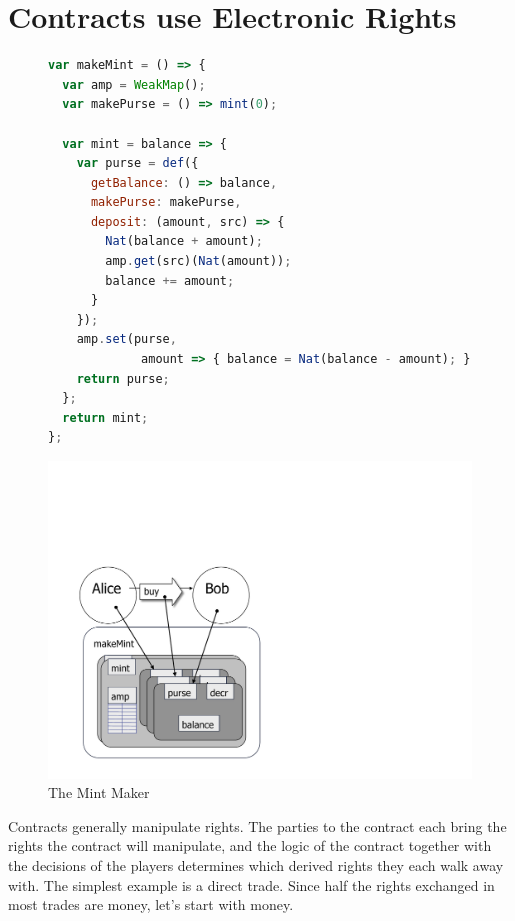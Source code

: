 \documentclass{llncs}
\begin{document}
\section{Contracts use Electronic Rights}

\begin{figure}[htbp]
\begin{minipage}{0.48\linewidth}
\begin{lstlisting}[language=javascript]
var makeMint = () => {
  var amp = WeakMap();
  var makePurse = () => mint(0);
  
  var mint = balance => {
    var purse = def({
      getBalance: () => balance,
      makePurse: makePurse,
      deposit: (amount, src) => {
        Nat(balance + amount);
        amp.get(src)(Nat(amount)); 
        balance += amount; 
      } 
    });
    amp.set(purse, 
             amount => { balance = Nat(balance - amount); });
    return purse;
  };
  return mint;
};
\end{lstlisting}
\end{minipage}
\begin{minipage}{0.48\linewidth}
\end{minipage}
\includegraphics[scale=0.3]{bw-mint.pdf}
\caption{The Mint Maker}
\label{makeMint}
\end{figure}


Contracts generally manipulate rights. The parties to the contract each bring the rights the contract will manipulate, and the logic of the contract together with the decisions of the players determines which derived rights they each walk away with. The simplest example is a direct trade. Since half the rights exchanged in most trades are money, let's start with money. 
\end{document}
